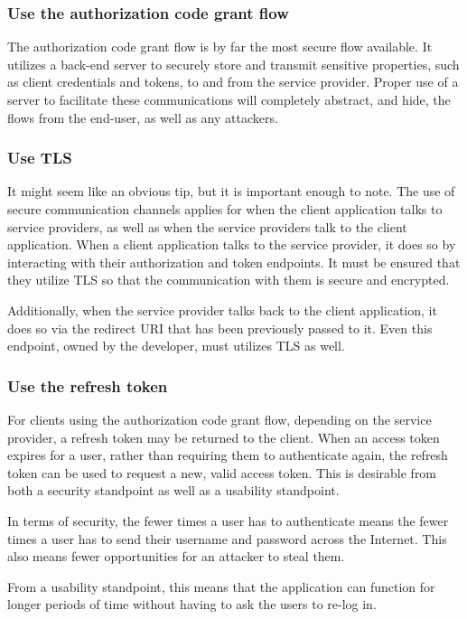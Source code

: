 \subsubsection{Use the authorization code grant flow}
The authorization code grant flow is by far the most secure flow available. It utilizes a back-end server to securely store and transmit sensitive properties, such as client credentials and tokens, to and from the service provider.
Proper use of a server to facilitate these communications will completely abstract, and hide, the flows from the end-user, as well as any attackers.

\subsubsection{Use TLS}
It might seem like an obvious tip, but it is important enough to note. The use of secure communication channels applies for when the client application talks to service providers, as well as when the service providers talk to the client application. When a client application talks to the service provider, it does so by interacting with their authorization and token endpoints. It must be ensured that they utilize TLS so that the communication with them is secure and encrypted.

Additionally, when the service provider talks back to the client application, it does so via the redirect URI that has been previously passed to it. Even this endpoint, owned by the developer, must utilizes TLS as well.

\subsubsection{Use the refresh token}
For clients using the authorization code grant flow, depending on the service provider, a refresh token may be returned to the client. When an access token expires for a user, rather than requiring them to authenticate again, the refresh token can be used to request a new, valid access token. This is desirable from both a security standpoint as well as a usability standpoint.

In terms of security, the fewer times a user has to authenticate means the fewer times a user has to send their username and password across the Internet. This also means fewer opportunities for an attacker to steal them.

From a usability standpoint, this means that the application can function for longer periods of time without having to ask the users to re-log in.

